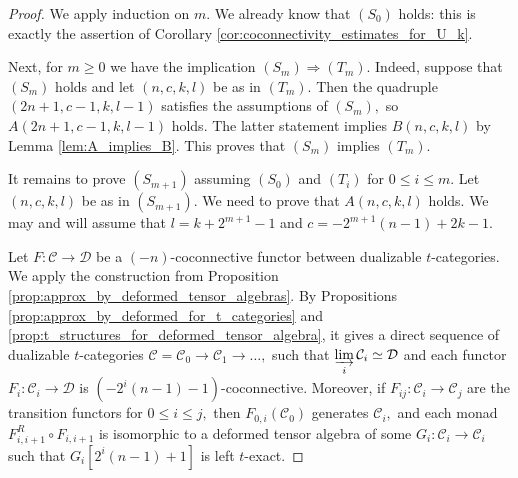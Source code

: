 \documentclass[11pt,leqno]{amsart}
\numberwithin{equation}{section}
\newcommand{\indlim}[1][]{\mathop{\varinjlim}\limits_{#1}}
\newcommand{\cD}{{\mathcal D}}
\newcommand{\cC}{{\mathcal C}}
\begin{document}
\begin{proof}
We apply induction on $m.$ We already know that $(S_0)$ holds: this is exactly the assertion of Corollary \ref{cor:coconnectivity_estimates_for_U_k}. 

Next, for $m\geq 0$ we have the implication $(S_m)\Rightarrow (T_m).$ Indeed, suppose that $(S_m)$ holds and let $(n,c,k,l)$ be as in $(T_m).$ Then the quadruple $(2n+1,c-1,k,l-1)$ satisfies the assumptions of $(S_m),$ so $A(2n+1,c-1,k,l-1)$ holds. The latter statement implies $B(n,c,k,l)$ by Lemma \ref{lem:A_implies_B}. This proves that $(S_m)$ implies $(T_m).$ 

It remains to prove $(S_{m+1})$ assuming $(S_0)$ and $(T_i)$ for $0\leq i\leq m.$ Let $(n,c,k,l)$ be as in $(S_{m+1}).$ We need to prove that $A(n,c,k,l)$ holds. We may and will assume that $l=k+2^{m+1}-1$ and $c=-2^{m+1}(n-1)+2k-1.$ 

Let $F:\cC\to\cD$ be a $(-n)$-coconnective functor between dualizable $t$-categories. We apply the construction from Proposition \ref{prop:approx_by_deformed_tensor_algebras}. By Propositions \ref{prop:approx_by_deformed_for_t_categories} and \ref{prop:t_structures_for_deformed_tensor_algebra}, it gives a direct sequence of dualizable $t$-categories $\cC=\cC_0\to\cC_1\to\dots,$ such that $\indlim[i]\cC_i\simeq\cD$ and each functor $F_i:\cC_i\to\cD$ is $(-2^i(n-1)-1)$-coconnective. Moreover, if $F_{ij}:\cC_i\to\cC_j$ are the transition functors for $0\leq i\leq j,$ then $F_{0,i}(\cC_0)$ generates $\cC_i,$ and each monad $F_{i,i+1}^R\circ F_{i,i+1}$ is isomorphic to a deformed tensor algebra of some $G_i:\cC_i\to\cC_i$ such that $G_i[2^i(n-1)+1]$ is left $t$-exact.


\end{proof}
\end{document}
